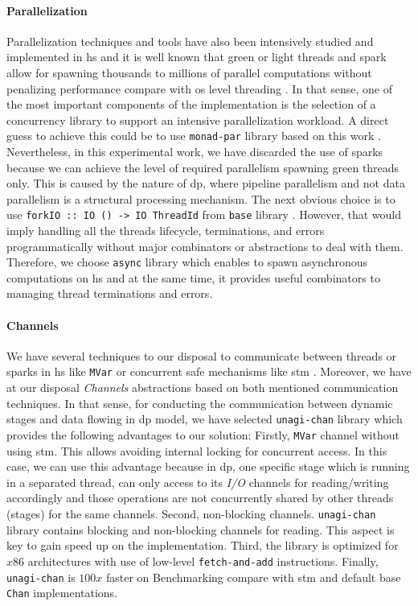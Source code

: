\documentclass[preprint]{elsarticle}
\begin{document}
\paragraph{Parallelization} Parallelization techniques and tools have also been intensively studied and implemented in \acrshort{hs} \cite{monadpar} and it is well known that green or light threads and spark allow for spawning thousands to millions of parallel computations without penalizing performance compare with \acrfull{os} level threading \cite{parallelbook}. In that sense, one of the most important components of the implementation is the selection of a concurrency library to support an intensive parallelization workload. A direct guess to achieve this could be to use \texttt{monad-par} library \cite{monadparlib} based on this work \cite{monadpar}. Nevertheless, in this experimental work, we have discarded the use of sparks \cite{sparks} because we can achieve the level of required parallelism spawning green threads only. This is caused by the nature of \acrshort{dp}, where pipeline parallelism and not data parallelism is a structural processing mechanism. The next obvious choice is to use \texttt{forkIO :: IO () -> IO ThreadId} from \texttt{base} library \cite{forkio}. However, that would imply handling all the threads lifecycle, terminations, and errors programmatically without major combinators or abstractions to deal with them. Therefore, we choose \texttt{async} library \cite{async}  which enables to spawn asynchronous computations \cite{parallelbook} on \acrshort{hs} and at the same time, it provides useful combinators to managing thread terminations and errors.

\paragraph{Channels\label{section:channels}} We have several techniques to our disposal to communicate between threads or sparks in \acrshort{hs} like \texttt{MVar} or concurrent safe mechanisms like \acrfull{stm} \cite{stm}. Moreover, we have at our disposal \textit{Channels} abstractions based on both mentioned communication techniques. In that sense, for conducting the communication between dynamic stages and data flowing in \acrshort{dp} model, we have selected \texttt{unagi-chan} library \cite{unagi} which provides the following advantages to our solution: Firstly,  \texttt{MVar} channel without using \acrshort{stm}. This allows avoiding internal locking for concurrent access. In this case, we can use this advantage because in \acrshort{dp}, one specific stage which is running in a separated thread, can only access to its \textit{I/O} channels for reading/writing accordingly and those operations are not concurrently shared by other threads (stages) for the same channels. Second,  non-blocking channels. \texttt{unagi-chan} library contains blocking and non-blocking channels for reading. This aspect is key to gain speed up on the implementation. Third, the library is optimized for $x86$ architectures with use of low-level \texttt{fetch-and-add} instructions. Finally, \texttt{unagi-chan} is $100x$ faster on Benchmarking compare with \acrshort{stm} and default base \texttt{Chan} implementations.
\end{document}
